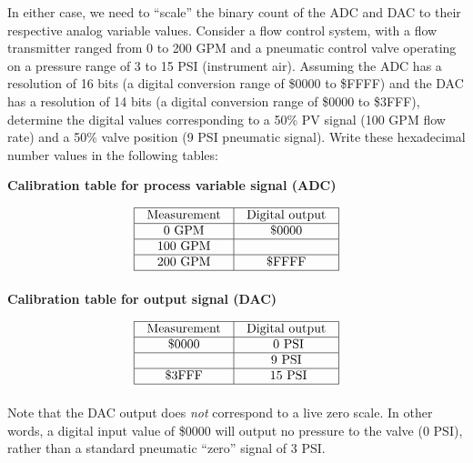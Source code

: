 \filbreak

In either case, we need to ``scale'' the binary count of the ADC and DAC to their respective analog variable values.  Consider a flow control system, with a flow transmitter ranged from 0 to 200 GPM and a pneumatic control valve operating on a pressure range of 3 to 15 PSI (instrument air).  Assuming the ADC has a resolution of 16 bits (a digital conversion range of \$0000 to \$FFFF) and the DAC has a resolution of 14 bits (a digital conversion range of \$0000 to \$3FFF), determine the digital values corresponding to a 50\% PV signal (100 GPM flow rate) and a 50\% valve position (9 PSI pneumatic signal).  Write these hexadecimal number values in the following tables:

\vskip 10pt

\noindent
{\bf Calibration table for process variable signal (ADC)}


$$\vbox{\offinterlineskip
\halign{\strut
\vrule \quad\hfil # \ \hfil & 
\vrule \quad\hfil # \ \hfil \vrule \cr
\noalign{\hrule}
%
Measurement & Digital output \cr
%
\noalign{\hrule}
%
0 GPM & \$0000 \cr
%
\noalign{\hrule}
%
100 GPM &  \cr
%
\noalign{\hrule}
%
200 GPM & \$FFFF \cr
%
\noalign{\hrule}
} %
}$$ %

\vskip 10pt

\noindent
{\bf Calibration table for output signal (DAC)}


$$\vbox{\offinterlineskip
\halign{\strut
\vrule \quad\hfil # \ \hfil & 
\vrule \quad\hfil # \ \hfil \vrule \cr
\noalign{\hrule}
%
Measurement & Digital output \cr
%
\noalign{\hrule}
%
\$0000 & 0 PSI\cr
%
\noalign{\hrule}
%
 & 9 PSI \cr
%
\noalign{\hrule}
%
\$3FFF & 15 PSI\cr
%
\noalign{\hrule}
} %
}$$ %

\vskip 10pt

Note that the DAC output does {\it not} correspond to a live zero scale.  In other words, a digital input value of \$0000 will output no pressure to the valve (0 PSI), rather than a standard pneumatic ``zero'' signal of 3 PSI.






